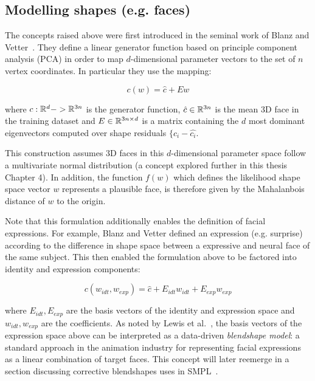 \subsection{Modelling shapes (e.g. faces)}

The concepts raised above were first introduced in the seminal work of Blanz and Vetter~\cite{blanz-vetter}. They define a linear generator function based on principle component analysis (PCA) in order to map $d$-dimensional parameter vectors to the set of $n$ vertex coordinates. In particular they use the mapping:

\begin{equation}
    c(w) = \hat{c} + Ew
\end{equation}

where $c: {\mathbb{R}^{d}} -> {\mathbb{R}^{3n}}$ is the generator function, $\hat{c} \in {\mathbb{R}^{3n}}$ is the mean 3D face in the training dataset and $E \in {\mathbb{R}^{3n \times d}}$ is a matrix containing the $d$ most dominant eigenvectors computed over shape residuals $\{c_i - \hat{c_i}$. 

This construction assumes 3D faces in this $d$-dimensional parameter space follow a multivariate normal distribution (a concept explored further in this thesis Chapter 4). In addition, the function $f(w)$ which defines the likelihood shape space vector $w$ represents a plausible face, is therefore given by the Mahalanbois distance of $w$ to the origin. 

Note that this formulation additionally enables the definition of facial expressions. For example, Blanz and Vetter defined an expression (e.g. surprise) according to the difference in shape space between a expressive and neural face of the same subject. This then enabled the formulation above to be factored into identity and expression components:

\begin{equation}
    c(w_{idt}, w_{exp}) = \hat{c} + E_{idt}w_{idt} + E_{exp}w_{exp}
\end{equation}

where $E_{idt}, E_{exp}$ are the basis vectors of the identity and expression space and $w_{idt}, w_{exp}$ are the coefficients. As noted by Lewis et al.~\cite{xxx}, the basis vectors of the expression space above can be interpreted as a data-driven \emph{blendshape model}: a standard approach in the animation industry for representing facial expressions as a linear combination of target faces. This concept will later reemerge in a section discussing corrective blendshapes uses in SMPL~\cite{loper15smpl}.

